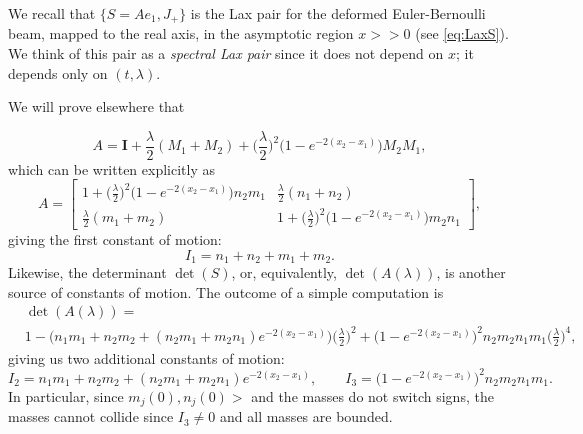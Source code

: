 \documentclass[10pt,a4paper]{article}
\numberwithin{equation}{section}
\theoremstyle{plain}
\theoremstyle{definition}
\renewcommand{\l}{\lambda}
\begin{document}
We recall that $\{S=Ae_1, J_+\}$ is the Lax pair for the deformed Euler-Bernoulli beam, mapped to the real axis,  in the asymptotic region $x>>0$ (see \eqref{eq:LaxS}).  We think of this pair as a \emph{spectral Lax pair} since it does not depend on $x$; it depends only on $(t,\l)$.  

We will prove elsewhere that 
 
\begin{equation*}
A=\mathbf{I}+\frac \lambda 2 (M_1+M_2)+ \big(\frac \lambda 2\big)^2 \big( 1-e^{-2(x_2-x_{1})}\big)M_2M_1,
\end{equation*}
which can be written explicitly as 
\begin{equation} 
A=\begin{bmatrix} 1+\big(\frac \lambda 2 \big)^2\big( 1-e^{-2(x_2-x_{1})}\big)n_2m_1& \frac \lambda 2(n_1+n_2)\\
\frac \lambda2 (m_1+m_2)& 1+\big(\frac \lambda 2\big)^2\big( 1-e^{-2(x_2-x_{1})}\big)m_2n_1\end{bmatrix}, 
\end{equation}
 giving the first constant of motion: 
 \begin{equation*}
I_1=n_1+n_2+m_1+m_2.
\end{equation*} 
Likewise, the determinant $\det(S)$, or, equivalently, $\det(A(\lambda))$,  is another source of constants of motion.  
The outcome of a simple computation is
\begin{align*} 
&\det(A(\l))=\\&1-\big(n_1m_1+n_2m_2 +(n_2m_1+m_2n_1)e^{-2(x_2-x_1)} \big) \big(\frac \lambda2\big)^2+ \big(1-e^{-2(x_2-x_1)}\big)^2 n_2m_2n_1m_1 \big(\frac\lambda2\big)^4,  
 \end{align*} 
 giving us two additional constants of motion: 
\begin{equation*} 
I_2=n_1m_1+n_2m_2 +(n_2m_1+m_2n_1)e^{-2(x_2-x_1)}  , \qquad I_3=\big(1-e^{-2(x_2-x_1)}\big)^2 n_2m_2n_1m_1.  
\end{equation*} 
In particular, since $m_j(0), n_j(0)>$ and the masses do not switch signs, the masses cannot collide since $I_3\neq 0$ and all masses are bounded. 
\end{document}

